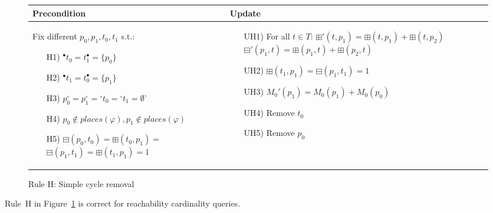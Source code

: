 \begin{figure}[h!]
    \begin{adjustbox}{center}
        \begin{tabular}{|p{63mm}|p{60mm}|} \hline
        Precondition & Update \\ \hline
        Fix different $p_0,p_1,t_0,t_1$ s.t.:
        \begin{itemize}[leftmargin=10mm]
            \item[H1)] ${}^\bullet t_0 = t_1^\bullet =\{p_0\}$
            \item[H2)] ${}^\bullet t_1 = t_0^\bullet =\{p_1\}$
            \item[H3)] $p_0^\circ = p_1^\circ = {}^\circ t_0 = {}^\circ t_1 = \emptyset$'
            \item[H4)] $p_0\notin places(\varphi),p_1\notin places(\varphi)$
            \item[H5)] $\boxminus(p_0, t_0)=\boxplus(t_0, p_1)=$\newline$\boxminus(p_1, t_1)=\boxplus(t_1, p_1)=1$
        \end{itemize}
        &
        \begin{itemize}[leftmargin=10mm]
            \item[UH1)] For all $t\in T$:\newline
                $\boxplus'(t,p_1)=\boxplus(t,p_1)+\boxplus(t,p_2)$\newline
                $\boxminus'(p_1,t)=\boxplus(p_1,t)+\boxplus(p_2,t)$
            \item[UH2)] $\boxplus(t_1,p_1)=\boxminus(p_1,t_1)=1$
            \item[UH3)] $M_0'(p_1)=M_0(p_1)+M_0(p_0)$
            \item[UH4)] Remove $t_0$
            \item[UH5)] Remove $p_0$
        \end{itemize} \\ \hline
        \end{tabular}
    \end{adjustbox}
    \caption{Rule H: Simple cycle removal}
    \label{fig:rule_h}
\end{figure}

\begin{theorem}\label{theorem:rule_h}
    Rule~H in Figure~\ref{fig:rule_h} is correct for reachability cardinality queries.
\end{theorem}
